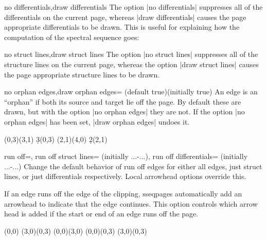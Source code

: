 \documentclass{ltxdoc}
\begin{document}
\begin{sseqdata}[name=ex1,degree={#1}{1-#1}]
\begin{keylist}{no differentials,draw differentials}
The option |no differentials| suppresses all of the differentials on the current page, whereas |draw differentials| causes the page appropriate differentials to be drawn. This is useful for explaining how the computation of the spectral sequence goes:
\end{keylist}

\begin{keylist}{no struct lines,draw struct lines}
The option |no struct lines| suppresses all of the structure lines on the current page, whereas the option |draw struct lines| causes the page appropriate structure lines to be drawn.
\end{keylist}

\begin{keylist}{no orphan edges,draw orphan edges= (default true)(initially true)}
An edge is an ``orphan'' if both its source and target lie off the page. By default these are drawn, but with the option |no orphan edges| they are not. If the option |no orphan edges| has been set, |draw orphan edges| undoes it.
\begin{codeexample}[width=10cm]
\begin{sseqdata}[
    name=orphan edges example,
    cohomological Serre grading,
    x range={0}{2}, y range={0}{2}]
\class(0,3)\class(3,1)
\d3(0,3)
\class(2,1)\class(4,0)
\d2(2,1)
\end{sseqdata}
\printpage[name=orphan edges example]
\hskip1cm
\printpage[name=orphan edges example,
    no orphan edges]
\end{codeexample}
\end{keylist}

\begin{keylist}{run off=, 
    run off struct lines=  (initially {...-...}),
    run off differentials= (initially {...-...})}
Change the default behavior of run off edges for either all edges, just struct lines, or just differentials respectively. Local arrowhead options override this.

If an edge runs off the edge of the clipping, sseqpages automatically add an arrowhead to indicate that the edge continues. This option controls which arrow head is added if the start or end of an edge runs off the page.
\begin{codeexample}[]
\begin{sseqpage}[x range={0}{2},y range={0}{2},draw orphan edges,run off={>}{stealth}]
\class(0,0)
\class(3,0)\class(0,3)
\structline(0,0)(3,0)
\structline[red](0,0)(0,3)
\structline[blue](3,0)(0,3)
\end{sseqpage}
\end{codeexample}
\end{keylist}



\end{sseqdata}
\end{document}
